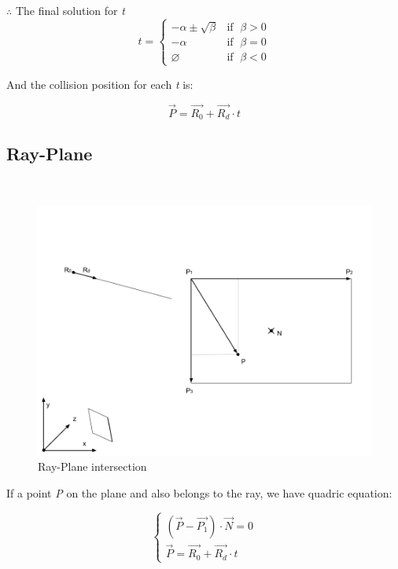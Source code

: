 $\therefore$ The final solution for \emph{t}
\[
t =
\begin{cases}
 -\alpha \pm \sqrt{\beta} & \text{if }\;\beta > 0 \\
-\alpha & \text{if }\;\beta = 0 \\
\varnothing & \text{if }\;\beta < 0
\end{cases}
\]

And the collision position for each \emph{t} is:

\[
\overrightarrow{P} = \overrightarrow{R_0} + \overrightarrow{R_d} \cdot t
\]

\subsection{Ray-Plane}
\parencite{stackoverflow.ray-plane.2014} \\

\begin{figure}[H]
\caption[ray-plane-intersection]{Ray-Plane intersection}
\label{fig:ray-plane}
\centering
\includegraphics[width=\linewidth]{Figures/ray-plane-intersection.png}
\decoRule
\end{figure}

If a point \emph{P} on the plane and also belongs to the ray, we have quadric equation:

\begin{equation}
\label{equ:ray-plane-intersection}
\left\{
\begin{array}{lr}
(\overrightarrow{P} - \overrightarrow{P_1}) \cdot \overrightarrow{N} = 0 \\
\overrightarrow{P} = \overrightarrow{R_0} + \overrightarrow{R_d} \cdot t
\end{array}
\right.
\end{equation}

